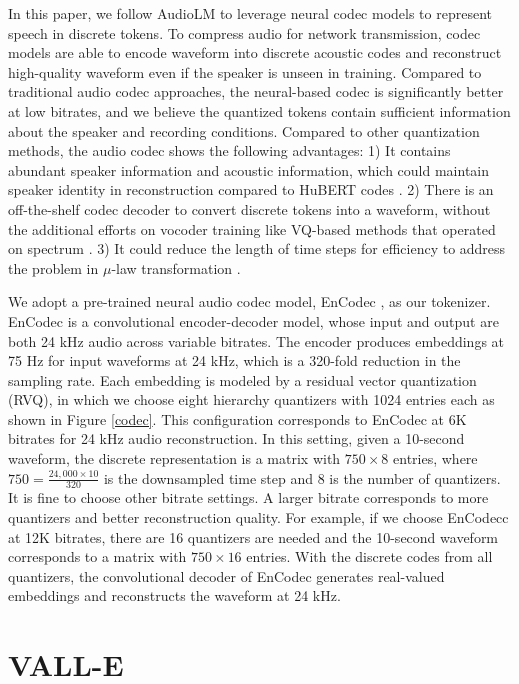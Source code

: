 \documentclass{article}
\theoremstyle{plain}
\theoremstyle{definition}
\theoremstyle{remark}
\newcommand\our{\textsc{VALL-E}}
\begin{document}
 In this paper, we follow AudioLM \citep{DBLP:journals/corr/abs-2209-03143} to leverage neural codec models to represent speech in discrete tokens. To compress audio for network transmission, codec models are able to encode waveform into discrete  acoustic codes and reconstruct high-quality waveform even if the speaker is unseen in training. Compared to traditional audio codec approaches, the neural-based codec is significantly better at low bitrates, and we believe the quantized tokens contain sufficient information about the speaker and recording conditions. Compared to other quantization methods, the audio codec shows the following advantages: 1) It contains abundant  speaker information and  acoustic information, which could maintain speaker identity in reconstruction compared to HuBERT codes \citep{hsu2021hubert}. 2)  There is an off-the-shelf codec decoder to convert  discrete tokens into a waveform, without the additional efforts on vocoder training like VQ-based methods that operated on spectrum \citep{DBLP:conf/interspeech/DuGC022}. 3) It could reduce the length of time steps for efficiency to address the problem in $\mu$-law transformation \citep{DBLP:conf/ssw/OordDZSVGKSK16}. 

We adopt a pre-trained neural audio codec model, EnCodec \citep{defossez2022high}, as our tokenizer. EnCodec is a convolutional encoder-decoder model, whose input and output are both 24 kHz audio across variable bitrates. 
The encoder produces embeddings at 75 Hz for input waveforms at 24 kHz, which is a 320-fold reduction in the sampling rate. Each embedding is modeled by a residual vector quantization (RVQ), in which we choose eight hierarchy quantizers with 1024 entries each as shown in Figure \ref{codec}. This configuration corresponds to EnCodec at 6K bitrates for 24 kHz audio reconstruction. In this setting, given a 10-second waveform, the discrete representation is a matrix with $ 750 \times 8$ entries, where $750=\frac{24,000 \times 10}{320}$ is the downsampled time step and 8 is the number of quantizers. 
It is fine to choose other bitrate settings. A larger bitrate corresponds to more quantizers and better reconstruction quality. For example, if we choose EnCodecc at 12K bitrates, there are 16 quantizers are needed and the 10-second waveform corresponds to a matrix with $ 750 \times 16$ entries.  With the discrete codes from all quantizers, the convolutional decoder of EnCodec generates real-valued embeddings and reconstructs the waveform at 24 kHz. 

\section{\our{}}
\end{document}
